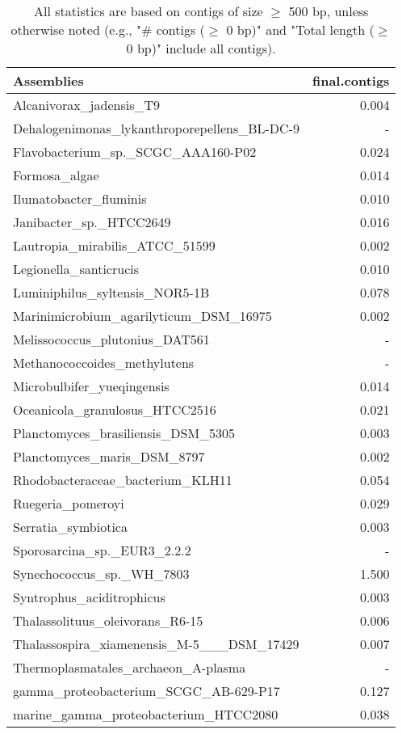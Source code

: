 \documentclass[12pt,a4paper]{article}
\begin{document}
\begin{table}[ht]
\begin{center}
\caption{All statistics are based on contigs of size $\geq$ 500 bp, unless otherwise noted (e.g., "\# contigs ($\geq$ 0 bp)" and "Total length ($\geq$ 0 bp)" include all contigs).}
\begin{tabular}{|l*{1}{|r}|}
\hline
Assemblies & final.contigs \\ \hline
Alcanivorax\_jadensis\_T9 & 0.004 \\ \hline
Dehalogenimonas\_lykanthroporepellens\_BL-DC-9 & - \\ \hline
Flavobacterium\_sp.\_SCGC\_AAA160-P02 & 0.024 \\ \hline
Formosa\_algae & 0.014 \\ \hline
Ilumatobacter\_fluminis & 0.010 \\ \hline
Janibacter\_sp.\_HTCC2649 & 0.016 \\ \hline
Lautropia\_mirabilis\_ATCC\_51599 & 0.002 \\ \hline
Legionella\_santicrucis & 0.010 \\ \hline
Luminiphilus\_syltensis\_NOR5-1B & 0.078 \\ \hline
Marinimicrobium\_agarilyticum\_DSM\_16975 & 0.002 \\ \hline
Melissococcus\_plutonius\_DAT561 & - \\ \hline
Methanococcoides\_methylutens & - \\ \hline
Microbulbifer\_yueqingensis & 0.014 \\ \hline
Oceanicola\_granulosus\_HTCC2516 & 0.021 \\ \hline
Planctomyces\_brasiliensis\_DSM\_5305 & 0.003 \\ \hline
Planctomyces\_maris\_DSM\_8797 & 0.002 \\ \hline
Rhodobacteraceae\_bacterium\_KLH11 & 0.054 \\ \hline
Ruegeria\_pomeroyi & 0.029 \\ \hline
Serratia\_symbiotica & 0.003 \\ \hline
Sporosarcina\_sp.\_EUR3\_2.2.2 & - \\ \hline
Synechococcus\_sp.\_WH\_7803 & 1.500 \\ \hline
Syntrophus\_aciditrophicus & 0.003 \\ \hline
Thalassolituus\_oleivorans\_R6-15 & 0.006 \\ \hline
Thalassospira\_xiamenensis\_M-5\_\_\_DSM\_17429 & 0.007 \\ \hline
Thermoplasmatales\_archaeon\_A-plasma & - \\ \hline
gamma\_proteobacterium\_SCGC\_AB-629-P17 & 0.127 \\ \hline
marine\_gamma\_proteobacterium\_HTCC2080 & 0.038 \\ \hline
\end{tabular}
\end{center}
\end{table}
\end{document}
